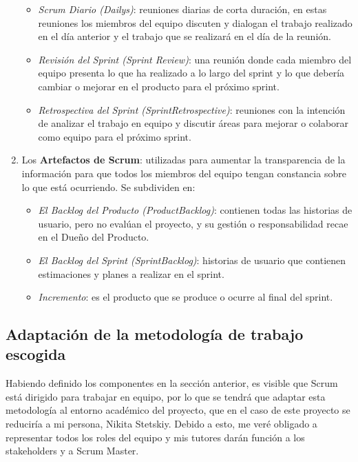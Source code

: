 \begin{enumerate}
\begin{itemize}
            \item
            \textit{Scrum Diario (Dailys)}: reuniones diarias de corta duración, en estas reuniones los miembros del equipo discuten y dialogan el trabajo realizado en el día anterior y el trabajo que se realizará en el día de la reunión.
    
            \item
            \textit{Revisión del Sprint (Sprint Review)}: una reunión donde cada miembro del equipo presenta lo que ha realizado a lo largo del sprint y lo que debería cambiar o mejorar en el producto para el próximo sprint.

            \item
            \textit{Retrospectiva del Sprint (SprintRetrospective)}: reuniones con la intención de analizar el trabajo en equipo y discutir áreas para mejorar o colaborar como equipo para el próximo sprint.
    
        \end{itemize}

    \item
    Los \textbf{Artefactos de Scrum}: utilizadas para aumentar la transparencia de la información para que todos los miembros del equipo tengan constancia sobre lo que está ocurriendo. Se subdividen en:
    
        \begin{itemize}
            \item
            \textit{El Backlog del Producto (ProductBacklog)}: contienen todas las historias de usuario, pero no evalúan el proyecto, y su gestión o responsabilidad recae en el Dueño del Producto.
    
            \item
            \textit{El Backlog del Sprint (SprintBacklog)}: historias de usuario que contienen estimaciones y planes a realizar en el sprint.
    
            \item
            \textit{Incremento}: es el producto que se produce o ocurre al final del sprint.
    
        \end{itemize}

\end{enumerate}

\vspace{0.3cm}

\subsection{Adaptación de la metodología de trabajo escogida}
Habiendo definido los componentes en la sección anterior, es visible que Scrum está dirigido para trabajar en equipo, por lo que se tendrá que adaptar esta metodología al entorno académico del proyecto, que en el caso de este proyecto se reduciría a mi persona, Nikita Stetskiy. Debido a esto, me veré obligado a representar todos los roles del equipo y mis tutores darán función a los stakeholders y a Scrum Master.

